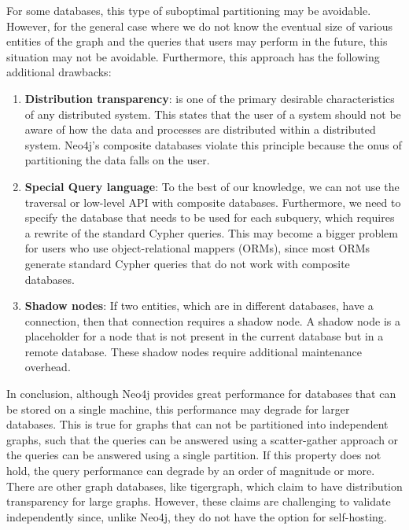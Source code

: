 \smallskip
For some databases, this type of suboptimal
partitioning may be avoidable. However, for the general case where we do not
know the eventual size of various entities of the graph and the queries that 
users may perform in the future, this situation may not be avoidable. Furthermore, this
approach has the following additional drawbacks:
\begin{enumerate}
    \item \textbf{Distribution transparency}: is one of the primary desirable
        characteristics of any distributed system. This states that the user of a
        system should not be aware of how the data and processes are distributed
        within a distributed system. Neo4j's composite databases violate this
        principle because the onus of partitioning the data falls on the user.
    \item \textbf{Special Query language}: To the best of our knowledge, we can
        not use the traversal or low-level API with composite databases.
        Furthermore, we need to specify the database that needs to be used for
        each subquery, which requires a rewrite of the standard Cypher queries.
        This may become a bigger problem for users who use object-relational
        mappers (ORMs), since most ORMs generate standard Cypher queries that
        do not work with composite databases.
    \item \textbf{Shadow nodes}: If two entities, which are in different
        databases, have a connection, then that connection requires a shadow
        node. A shadow node is a placeholder for a node that is not
        present in the current database but in a remote database. These shadow
        nodes require additional maintenance overhead.
\end{enumerate}

\bigskip
In conclusion, although Neo4j provides great performance for databases that can
be stored on a single machine, this performance may degrade for larger
databases. This is true for graphs that can not be partitioned into independent
graphs, such that the queries can be answered using a scatter-gather
approach or the queries can be answered using a single partition. If this
property does not hold, the query performance can degrade by an order of
magnitude or more. There are other graph databases, like
tigergraph\cite{tigergraph}, which claim to have
distribution transparency for large graphs. However, these claims are
challenging
to validate independently since, unlike Neo4j, they do not have the option for
self-hosting.

